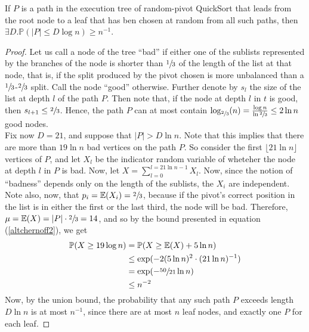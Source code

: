 	\begin{theorem}
		\label{theorem:quicksortheight}
		If $P$ is a path in the execution tree of random-pivot QuickSort that leads from 
		the root node to a leaf that has ben chosen at random from all such paths, then 
		$\exists D. \mathbb{P}(|P| \leq D \log n) \geq  n^{-1}$.
	\end{theorem}
	\begin{proof}
		Let us call a node of the tree ``bad'' if either one of the sublists represented 
		by the branches of the node is shorter than $\sfrac{1}{3}$ of the length of the 
		list at that node, that is, if the split produced by the pivot chosen is more 
		unbalanced than a $\sfrac{1}{3}$-$\sfrac{2}{3}$ split. Call the node ``good'' 
		otherwise. Further denote by $s_l$ the size of the list at depth $l$ of the path 
		$P$. Then note that, if the node at depth $l$ in $t$ is good, then $s_{l+1} \leq 
		\sfrac{2}{3}$. Hence, the path $P$ can at most contain $\log_{\sfrac{2}{3}}(n) = 
		\frac{\log n}{\ln \sfrac{2}{3}} \leq 2 \ln n$ good nodes. 
		\\
		Fix now $D = 21$, and suppose that $|P| > D \ln n$. Note that this implies that 
		there are more than $19 \ln n$ bad vertices on the path $P$. So consider the first 
		$\lfloor 21 \ln n \rfloor$ vertices of $P$, and let $X_l$ be the indicator random 
		variable of wheteher the node at depth $l$ in $P$ is bad. Now, let $X = \sum_{l = 0
		}^{l = 21 \ln n -1} X_l$. Now, since the notion of ``badness'' depends only on the 
		length of the sublists, the $X_i$ are independent. Note also, now, that $p_i = 
		\mathbb{E}(X_i) = \sfrac{2}{3}$, because if the pivot's correct position in the 
		list is in either the first or the last third, the node will be bad. Therefore, 
		$\mu = \mathbb{E}(X) = |P|\cdot \sfrac{2}{3}=14$, and so by the bound presented in 
		equation (\ref{altchernoff2}), we get
		\begin{align*}
			\mathbb{P}(X \geq 19 \log n) &= \mathbb{P}(X\geq \mathbb{E}(X) + 5\ln n) \\
			&\leq \exp(-2(5\ln n)^2\cdot(21\ln n)^{-1}) \\
			&= \exp(-\sfrac{50}{21}\ln n) \\
			&\leq n^{-2}
		\end{align*}
		Now, by the union bound, the probability that any such path $P$ exceeds length 
		$D \ln n$ is at most $n^{-1}$, since there are at most $n$ leaf nodes, and exactly
		one $P$ for each leaf.
	\end{proof}
	\begin{comment}
		As the reader is hopefully aware, it is impossible to conduct comparison-based 
		sorting of $n$ numbers using less than $\Omega(n \log n)$ comparisons, where of 
		course the constant co\"efficient may be improved somewhat. \\
		It should be noted that, strictly speaking, it is possible to deterministically 
		optimize the choice of pivot to always split the list in two almost equally long 
		sublists. This, however, makes the implementation harder, and less understandable, 
		as compared to the choice of randomly picking the pivot, which is why, in practice, 
		methods based on the one discussed here are used.
	\end{comment}


